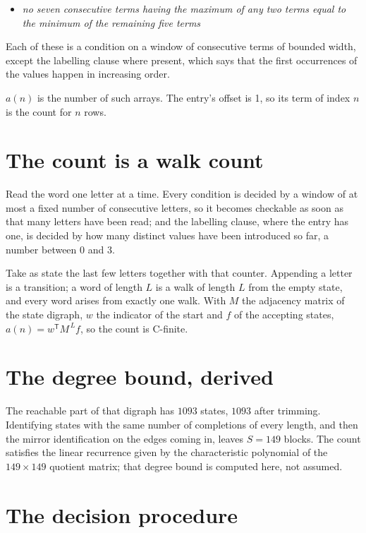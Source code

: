 \documentclass[11pt]{article}
\theoremstyle{definition}
\begin{document}
\begin{itemize}

\item {\itshape no seven consecutive terms having the maximum of any two terms equal to the minimum of the remaining five terms}

\end{itemize}

Each of these is a condition on a window of consecutive terms of bounded width, except the labelling clause where present, which says that the first occurrences of the values happen in increasing order.

$a(n)$ is the number of such arrays. The entry's offset is 1, so its term of index $n$ is the count for $n$ rows.

\section{The count is a walk count}

Read the word one letter at a time. Every condition is decided by a window of at most a fixed number of consecutive letters, so it becomes checkable as soon as that many letters have been read; and the labelling clause, where the entry has one, is decided by how many distinct values have been introduced so far, a number between $0$ and 3.

Take as state the last few letters together with that counter. Appending a letter is a transition; a word of length $L$ is a walk of length $L$ from the empty state, and every word arises from exactly one walk. With $M$ the adjacency matrix of the state digraph, $w$ the indicator of the start and $f$ of the accepting states, $a(n) = w^{\mathsf T}M^{\,L}f$, so the count is C-finite.

\section{The degree bound, derived}

The reachable part of that digraph has $1093$ states, $1093$ after trimming. Identifying states with the same number of completions of every length, and then the mirror identification on the edges coming in, leaves $S = 149$ blocks. The count satisfies the linear recurrence given by the characteristic polynomial of the $149\times149$ quotient matrix; that degree bound is computed here, not assumed.

\section{The decision procedure}
\end{document}
